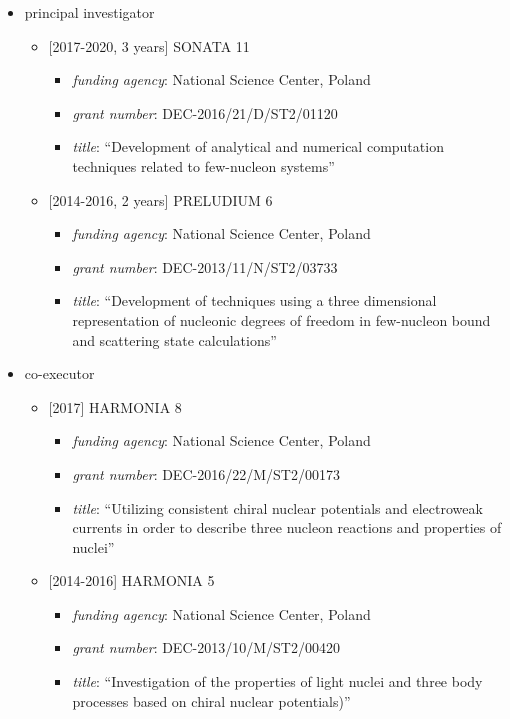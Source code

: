 \begin{itemize}
\tightlist
\item
  principal investigator

  \begin{itemize}
  \tightlist
  \item
    {[}2017-2020, 3 years{]} SONATA 11

    \begin{itemize}
    \tightlist
    \item
      \emph{funding agency}: National Science Center, Poland
    \item
      \emph{grant number}: DEC-2016/21/D/ST2/01120
    \item
      \emph{title}: ``Development of analytical and numerical
      computation techniques related to few-nucleon systems''
    \end{itemize}
  \item
    {[}2014-2016, 2 years{]} PRELUDIUM 6

    \begin{itemize}
    \tightlist
    \item
      \emph{funding agency}: National Science Center, Poland
    \item
      \emph{grant number}: DEC-2013/11/N/ST2/03733
    \item
      \emph{title}: ``Development of techniques using a three
      dimensional representation of nucleonic degrees of freedom in
      few-nucleon bound and scattering state calculations''
    \end{itemize}
  \end{itemize}
\item
  co-executor

  \begin{itemize}
  \tightlist
  \item
    {[}2017{]} HARMONIA 8

    \begin{itemize}
    \tightlist
    \item
      \emph{funding agency}: National Science Center, Poland
    \item
      \emph{grant number}: DEC-2016/22/M/ST2/00173
    \item
      \emph{title}: ``Utilizing consistent chiral nuclear potentials and
      electroweak currents in order to describe three nucleon reactions
      and properties of nuclei''
    \end{itemize}
  \item
    {[}2014-2016{]} HARMONIA 5

    \begin{itemize}
    \tightlist
    \item
      \emph{funding agency}: National Science Center, Poland
    \item
      \emph{grant number}: DEC-2013/10/M/ST2/00420
    \item
      \emph{title}: ``Investigation of the properties of light nuclei
      and three body processes based on chiral nuclear potentials)''
    \end{itemize}
  \end{itemize}
\end{itemize}

